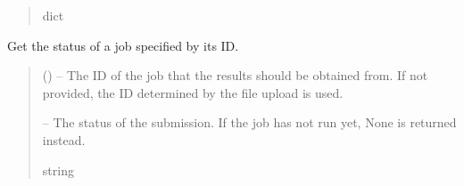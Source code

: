 \documentclass[letterpaper,11pt,english]{sphinxmanual}
\begin{document}
\begin{savenotes}
\begin{fulllineitems}
\begin{savenotes}
\begin{fulllineitems}
\begin{quote}
\begin{description}
\begin{itemize}
\end{itemize}


\sphinxAtStartPar
dict

\end{description}\end{quote}

\end{fulllineitems}\end{savenotes}


\begin{savenotes}\begin{fulllineitems}
\label{\detokenize{code/opihiexarata.astrometry.webclient:opihiexarata.astrometry.webclient.AstrometryNetWebAPIEngine.get_job_status}}
\pysigstartsignatures
{}
\pysigstopsignatures
\sphinxAtStartPar
Get the status of a job specified by its ID.
\begin{quote}\begin{description}
\sphinxAtStartPar
{} (\sphinxstyleliteralemphasis{\sphinxupquote{, }}) – The ID of the job that the results should be obtained from. If not
provided, the ID determined by the file upload is used.

\sphinxAtStartPar
{} – The status of the submission. If the job has not run yet, None is
returned instead.

\sphinxAtStartPar
string

\end{description}\end{quote}

\end{fulllineitems}\end{savenotes}



\end{fulllineitems}
\end{savenotes}
\end{document}
